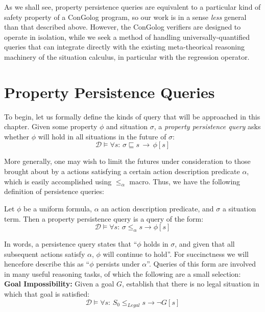 As we shall see, property persistence queries are equivalent to a
particular kind of safety property of a ConGolog program, so our work
is in a sense \emph{less} general than that described above. However,
the ConGolog verifiers are designed to operate in isolation, while
we seek a method of handling universally-quantified queries that can
integrate directly with the existing meta-theorical reasoning machinery
of the situation calculus, in particular with the regression operator.


\section{Property Persistence Queries\label{sec:Persistence:Definitions}}

To begin, let us formally define the kinds of query that will be approached
in this chapter. Given some property $\phi$ and situation $\sigma$,
a \emph{property persistence query} asks whether $\phi$ will hold
in all situations in the future of $\sigma$: \[
\mathcal{D}\models\forall s:\,\sigma\sqsubseteq s\,\rightarrow\,\phi[s]\]


More generally, one may wish to limit the futures under consideration
to those brought about by a actions satisfying a certain action description
predicate $\alpha$, which is easily accomplished using $\leq_{\alpha}$
macro. Thus, we have the following definition of persistence queries:

\begin{defnL}
 Let $\phi$ be a uniform
formula, $\alpha$ an action description predicate, and $\sigma$
a situation term. Then a property persistence query is a query of
the form:\[
\mathcal{D}\models\forall s:\,\sigma\le_{\alpha}s\rightarrow\phi[s]\]

\end{defnL}
In words, a persistence query states that {}``$\phi$ holds in $\sigma$,
and given that all subsequent actions satisfy $\alpha$, $\phi$ will
continue to hold''. For succinctness we will hencefore describe this
as {}``$\phi$ persists under $\alpha$''. Queries of this form
are involved in many useful reasoning tasks, of which the following
are a small selection:\\


\textbf{Goal Impossibility:} Given a goal $G$, establish that there
is no legal situation in which that goal is satisfied:\[
\mathcal{D}\models\forall s:\, S_{0}\leq_{Legal}s\rightarrow\neg G[s]\]


